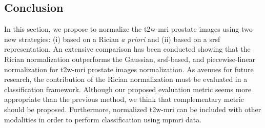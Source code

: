 \subsection{Conclusion}\label{subsec:chp5:T2-norm:dis-con}
In this section, we propose to normalize the \ac{t2w}-\ac{mri} prostate images using two new strategies: (i) based on a Rician \textit{a priori} and (ii) based on a \ac{srsf} representation.
An extensive comparison has been conducted showing that the Rician normalization outperforms the Gaussian, \ac{srsf}-based, and piecewise-linear normalization for \ac{t2w}-\ac{mri} prostate images normalization.
As avenues for future research, the contribution of the Rician normalization must be evaluated in a classification framework.
Although our proposed evaluation metric seems more appropriate than the previous method, we think that complementary metric should be proposed.
Furthermore, normalized \ac{t2w}-\ac{mri} can be included with other modalities in order to perform classification using \ac{mpmri} data.
